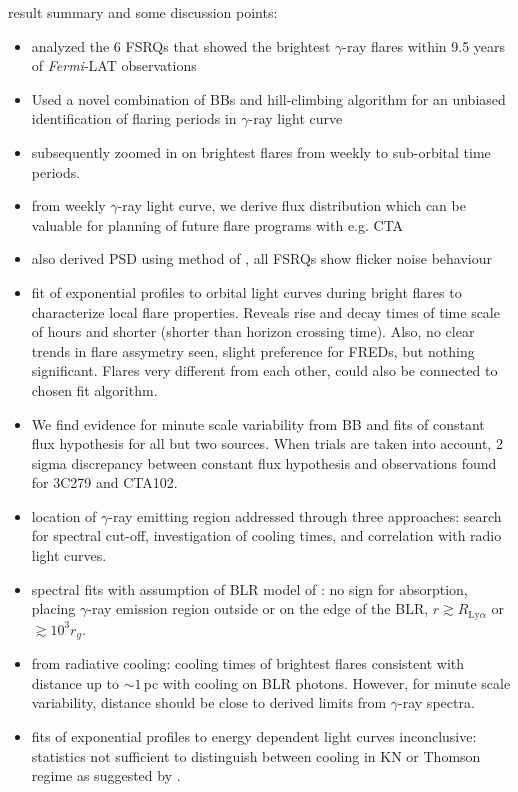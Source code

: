 \documentclass[twocolumn,linenumbers]{aastex62}
\newcommand{\gray}{$\gamma$-ray\xspace}
\newcommand{\fermiLAT}{\emph{Fermi}-LAT\xspace}
\begin{document}
result summary and some discussion points:
\begin{itemize}
\item analyzed the 6 FSRQs that showed the brightest \gray flares within 9.5 years of \fermiLAT observations
\item Used a novel combination of BBs and hill-climbing algorithm for an unbiased identification of flaring periods in \gray light curve
\item subsequently zoomed in on brightest flares from weekly to sub-orbital time periods. 
\item from weekly \gray light curve, we derive flux distribution which can be valuable for planning of future flare programs with e.g. CTA
\item also derived PSD using method of \citet{2014MNRAS.445..437M}, all FSRQs show flicker noise behaviour
\item fit of exponential profiles to orbital light curves during bright flares to characterize local flare properties. Reveals rise and decay times of time scale of hours and shorter (shorter than horizon crossing time). 
Also, no clear trends in flare assymetry seen, slight preference for FREDs, but nothing significant. Flares very different from each other, could also be connected to chosen fit algorithm.
\item We find evidence for minute scale variability from BB and fits of constant flux hypothesis for all but two sources. 
When trials are taken into account, 2 sigma discrepancy between constant flux hypothesis and observations found for 3C279 and CTA102. 
\item location of \gray emitting region addressed through three approaches: search for spectral cut-off, investigation of cooling times, and correlation with radio light curves. 
\item spectral fits with assumption of BLR model of \citet{finke2016}: no sign for absorption, placing \gray emission region outside or on the edge of the BLR, $r \gtrsim R_{\mathrm{Ly}\alpha}$ or $\gtrsim 10^3r_g$. 
\item from radiative cooling: cooling times of brightest flares consistent with distance up to $\sim 1\,$pc with cooling on BLR photons. However, for minute scale variability, distance should be close to derived limits from \gray spectra. 
\item fits of exponential profiles to energy dependent light curves inconclusive: statistics not sufficient to distinguish between cooling in KN or Thomson regime as suggested by \citet{2012ApJ...758L..15D}. 

\end{itemize}
\end{document}
